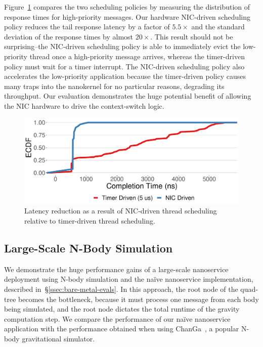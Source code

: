 Figure~\ref{fig:scheduling-latency} compares the two scheduling policies by measuring the distribution of response times for high-priority messages.
Our hardware NIC-driven scheduling policy reduces the tail response latency by a factor of $5.5\times$ and the standard deviation of the response times by almost $20\times$.
This result should not be surprising--the NIC-driven scheduling policy is able to immediately evict the low-priority thread once a high-priority message arrives, whereas the timer-driven policy must wait for a timer interrupt.
The NIC-driven scheduling policy also accelerates the low-priority application because the timer-driven policy causes many traps into the nanokernel for no particular reasons, degrading its throughput. Our evaluation demonstrates the huge potential benefit of allowing the NIC hardware to drive the context-switch logic.

\begin{figure}
  \includegraphics[width=\linewidth]{./figures/scheduling-comptimes}
  \caption{Latency reduction as a result of NIC-driven thread scheduling relative to timer-driven thread scheduling.}
  \label{fig:scheduling-latency}
\end{figure}


\subsection{Large-Scale N-Body Simulation}
\label{ssec:large-eval}
We demonstrate the huge performance gains of a large-scale nanoservice deployment using N-body simulation and the na\"ive nanoservice implementation, described in~\S\ref{ssec:bare-metal-evals}.
In this approach, the root node of the quad-tree becomes the bottleneck, because it must process one message from each body being simulated, and the root node dictates the total runtime of the gravity computation step.
We compare the performance of our na\"ive nanoservice application with the performance obtained when using ChanGa~\cite{changa}, a popular N-body gravitational simulator.

